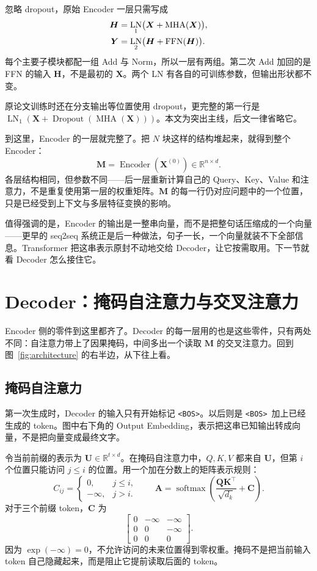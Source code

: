 \documentclass[UTF8,a4paper,12pt]{ctexart}
\numberwithin{equation}{section}
\DeclareMathOperator{\softmax}{softmax}
\DeclareMathOperator{\LN}{LN}
\DeclareMathOperator{\FFN}{FFN}
\DeclareMathOperator{\MHA}{MHA}
\newcommand{\R}{\mathbb{R}}
\newcommand{\bos}{\texttt{<BOS>}}
\begin{document}
忽略 dropout，原始 Encoder 一层只需写成
\begin{align}
\bm H&=\LN_1\bigl(\bm X+\MHA(\bm X)\bigr),\notag\\
\bm Y&=\LN_2\bigl(\bm H+\FFN(\bm H)\bigr).
\label{eq:encoderblock}
\end{align}
每个主要子模块都配一组 Add 与 Norm，所以一层有两组。第二次 Add 加回的是 FFN 的输入 $\bm H$，不是最初的 $\bm X$。两个 LN 有各自的可训练参数，但输出形状都不变。

原论文训练时还在分支输出等位置使用 dropout，更完整的第一行是 $\LN_1(\bm X+\operatorname{Dropout}(\MHA(\bm X)))$。本文为突出主线，后文一律省略它。

到这里，Encoder 的一层就完整了。把 $N$ 块这样的结构堆起来，就得到整个 Encoder：
\begin{equation}
\bm M=\operatorname{Encoder}(\bm X^{(0)})\in\R^{n\times d}.
\label{eq:memory}
\end{equation}
各层结构相同，但参数不同——后一层重新计算自己的 Query、Key、Value 和注意力，不是重复使用第一层的权重矩阵。$\bm M$ 的每一行仍对应问题中的一个位置，只是已经受到上下文与多层特征变换的影响。

值得强调的是，Encoder 的输出是一整串向量，而不是把整句话压缩成的一个向量——更早的 seq2seq 系统正是后一种做法，句子一长，一个向量就装不下全部信息。Transformer 把这串表示原封不动地交给 Decoder，让它按需取用。下一节就看 Decoder 怎么接住它。

\section{Decoder：掩码自注意力与交叉注意力}
\label{sec:decoder}

Encoder 侧的零件到这里都齐了。Decoder 的每一层用的也是这些零件，只有两处不同：自注意力带上了因果掩码，中间多出一个读取 $\bm M$ 的交叉注意力。回到图~\ref{fig:architecture} 的右半边，从下往上看。

\subsection{掩码自注意力}

第一次生成时，Decoder 的输入只有开始标记 \bos。以后则是 \bos\ 加上已经生成的 token。图中右下角的 Output Embedding，表示把这串已知输出转成向量，不是把向量变成最终文字。

令当前前缀的表示为 $\bm U\in\R^{t\times d}$。在掩码自注意力中，$Q,K,V$ 都来自 $\bm U$，但第 $i$ 个位置只能访问 $j\le i$ 的位置。用一个加在分数上的矩阵表示规则：
\begin{equation}
C_{ij}=\begin{cases}
0,&j\le i,\\
-\infty,&j>i.
\end{cases}
\qquad
\bm A=\softmax\!\left(\frac{\bm Q\bm K^\top}{\sqrt{d_k}}+\bm C\right).
\label{eq:causalmask}
\end{equation}
对于三个前缀 token，$\bm C$ 为
\[
\begin{bmatrix}
0&-\infty&-\infty\\
0&0&-\infty\\
0&0&0
\end{bmatrix}.
\]
因为 $\exp(-\infty)=0$，不允许访问的未来位置得到零权重。掩码不是把当前输入 token 自己隐藏起来，而是阻止它提前读取后面的 token。
\end{document}
